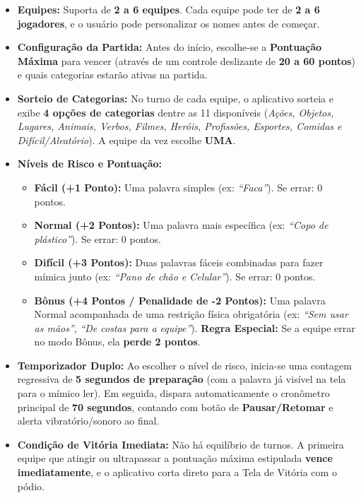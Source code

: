 \documentclass[12pt,a4paper]{article}
\begin{document}
\begin{itemize}
  \item \textbf{Equipes:} Suporta de \textbf{2 a 6 equipes}. Cada equipe pode ter de \textbf{2 a 6 jogadores}, e o usuário pode personalizar os nomes antes de começar.
  \item \textbf{Configuração da Partida:} Antes do início, escolhe-se a \textbf{Pontuação Máxima} para vencer (através de um controle deslizante de \textbf{20 a 60 pontos}) e quais categorias estarão ativas na partida.
  \item \textbf{Sorteio de Categorias:} No turno de cada equipe, o aplicativo sorteia e exibe \textbf{4 opções de categorias} dentre as 11 disponíveis (\textit{Ações, Objetos, Lugares, Animais, Verbos, Filmes, Heróis, Profissões, Esportes, Comidas e Difícil/Aleatório}). A equipe da vez escolhe \textbf{UMA}.
  \item \textbf{Níveis de Risco e Pontuação:}
    \begin{itemize}
      \item \textbf{Fácil (+1 Ponto):} Uma palavra simples (ex: \textit{``Faca''}). Se errar: 0 pontos.
      \item \textbf{Normal (+2 Pontos):} Uma palavra mais específica (ex: \textit{``Copo de plástico''}). Se errar: 0 pontos.
      \item \textbf{Difícil (+3 Pontos):} Duas palavras fáceis combinadas para fazer mímica junto (ex: \textit{``Pano de chão e Celular''}). Se errar: 0 pontos.
      \item \textbf{Bônus (+4 Pontos / Penalidade de -2 Pontos):} Uma palavra Normal acompanhada de uma restrição física obrigatória (ex: \textit{``Sem usar as mãos''}, \textit{``De costas para a equipe''}). \textbf{Regra Especial:} Se a equipe errar no modo Bônus, ela \textbf{perde 2 pontos}.
    \end{itemize}
  \item \textbf{Temporizador Duplo:} Ao escolher o nível de risco, inicia-se uma contagem regressiva de \textbf{5 segundos de preparação} (com a palavra já visível na tela para o mímico ler). Em seguida, dispara automaticamente o cronômetro principal de \textbf{70 segundos}, contando com botão de \textbf{Pausar/Retomar} e alerta vibratório/sonoro ao final.
  \item \textbf{Condição de Vitória Imediata:} Não há equilíbrio de turnos. A primeira equipe que atingir ou ultrapassar a pontuação máxima estipulada \textbf{vence imediatamente}, e o aplicativo corta direto para a Tela de Vitória com o pódio.
\end{itemize}
\end{document}

